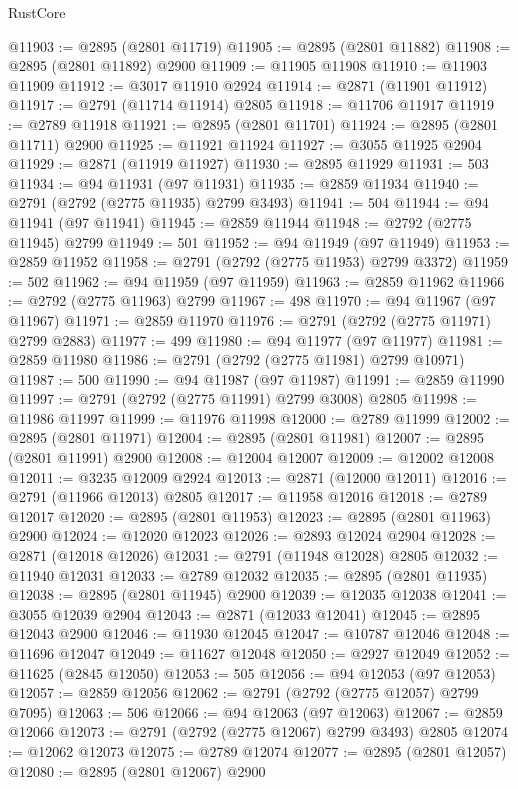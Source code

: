 \begin{lexlean}{RustCore}
\begin{coremodule}
@11903 := @2895 (@2801 @11719)
@11905 := @2895 (@2801 @11882)
@11908 := @2895 (@2801 @11892) @2900
@11909 := @11905 @11908
@11910 := @11903 @11909
@11912 := @3017 @11910 @2924
@11914 := @2871 (@11901 @11912)
@11917 := @2791 (@11714 @11914) @2805
@11918 := @11706 @11917
@11919 := @2789 @11918
@11921 := @2895 (@2801 @11701)
@11924 := @2895 (@2801 @11711) @2900
@11925 := @11921 @11924
@11927 := @3055 @11925 @2904
@11929 := @2871 (@11919 @11927)
@11930 := @2895 @11929
@11931 := 503
@11934 := @94 @11931 (@97 @11931)
@11935 := @2859 @11934
@11940 := @2791 (@2792 (@2775 @11935) @2799 @3493)
@11941 := 504
@11944 := @94 @11941 (@97 @11941)
@11945 := @2859 @11944
@11948 := @2792 (@2775 @11945) @2799
@11949 := 501
@11952 := @94 @11949 (@97 @11949)
@11953 := @2859 @11952
@11958 := @2791 (@2792 (@2775 @11953) @2799 @3372)
@11959 := 502
@11962 := @94 @11959 (@97 @11959)
@11963 := @2859 @11962
@11966 := @2792 (@2775 @11963) @2799
@11967 := 498
@11970 := @94 @11967 (@97 @11967)
@11971 := @2859 @11970
@11976 := @2791 (@2792 (@2775 @11971) @2799 @2883)
@11977 := 499
@11980 := @94 @11977 (@97 @11977)
@11981 := @2859 @11980
@11986 := @2791 (@2792 (@2775 @11981) @2799 @10971)
@11987 := 500
@11990 := @94 @11987 (@97 @11987)
@11991 := @2859 @11990
@11997 := @2791 (@2792 (@2775 @11991) @2799 @3008) @2805
@11998 := @11986 @11997
@11999 := @11976 @11998
@12000 := @2789 @11999
@12002 := @2895 (@2801 @11971)
@12004 := @2895 (@2801 @11981)
@12007 := @2895 (@2801 @11991) @2900
@12008 := @12004 @12007
@12009 := @12002 @12008
@12011 := @3235 @12009 @2924
@12013 := @2871 (@12000 @12011)
@12016 := @2791 (@11966 @12013) @2805
@12017 := @11958 @12016
@12018 := @2789 @12017
@12020 := @2895 (@2801 @11953)
@12023 := @2895 (@2801 @11963) @2900
@12024 := @12020 @12023
@12026 := @2893 @12024 @2904
@12028 := @2871 (@12018 @12026)
@12031 := @2791 (@11948 @12028) @2805
@12032 := @11940 @12031
@12033 := @2789 @12032
@12035 := @2895 (@2801 @11935)
@12038 := @2895 (@2801 @11945) @2900
@12039 := @12035 @12038
@12041 := @3055 @12039 @2904
@12043 := @2871 (@12033 @12041)
@12045 := @2895 @12043 @2900
@12046 := @11930 @12045
@12047 := @10787 @12046
@12048 := @11696 @12047
@12049 := @11627 @12048
@12050 := @2927 @12049
@12052 := @11625 (@2845 @12050)
@12053 := 505
@12056 := @94 @12053 (@97 @12053)
@12057 := @2859 @12056
@12062 := @2791 (@2792 (@2775 @12057) @2799 @7095)
@12063 := 506
@12066 := @94 @12063 (@97 @12063)
@12067 := @2859 @12066
@12073 := @2791 (@2792 (@2775 @12067) @2799 @3493) @2805
@12074 := @12062 @12073
@12075 := @2789 @12074
@12077 := @2895 (@2801 @12057)
@12080 := @2895 (@2801 @12067) @2900

\end{coremodule}
\end{lexlean}
